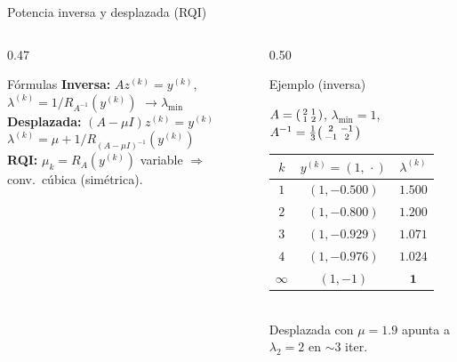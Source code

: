 \documentclass[aspectratio=169,10pt]{beamer}
\begin{document}
\begin{frame}{Potencia inversa y desplazada (RQI)}
\begin{columns}[T]
\begin{column}{0.47\textwidth}
\begin{cardidea}{Fórmulas}{\faSuperscript}
{\footnotesize \textbf{Inversa:} $Az^{(k)}=y^{(k)}$, $\lambda^{(k)}=1/R_{A^{-1}}(y^{(k)})$ $\to\lambda_{\min}$\\[1.4mm]
\textbf{Desplazada:} $(A-\mu I)z^{(k)}=y^{(k)}$\\[0.4mm]
$\lambda^{(k)}=\mu+1/R_{(A-\mu I)^{-1}}(y^{(k)})$\\[1.4mm]
\textbf{RQI:} $\mu_k=R_A(y^{(k)})$ variable $\Rightarrow$ conv.\ cúbica (simétrica).}
\end{cardidea}
\end{column}
\begin{column}{0.50\textwidth}
\begin{cardgear}{Ejemplo (inversa)}{\faCalculator}
\centering
{\footnotesize $A=\begin{psmallmatrix}2&1\\1&2\end{psmallmatrix}$, $\lambda_{\min}=1$, $A^{-1}=\tfrac13\begin{psmallmatrix}2&-1\\-1&2\end{psmallmatrix}$\\[1mm]
\renewcommand{\arraystretch}{1.2}
\begin{tabular}{c|cc}
$k$ & $y^{(k)}=(1,\,\cdot)$ & $\lambda^{(k)}$\\\hline
$1$&$(1,-0.500)$&$1.500$\\ $2$&$(1,-0.800)$&$1.200$\\ $3$&$(1,-0.929)$&$1.071$\\ $4$&$(1,-0.976)$&$1.024$\\ $\infty$&$(1,-1)$&$\mathbf 1$\\
\end{tabular}}\\[1mm]
{\footnotesize Desplazada con $\mu=1.9$ apunta a $\lambda_2=2$ en $\sim3$ iter.}
\end{cardgear}
\end{column}
\end{columns}
\end{frame}
\end{document}
